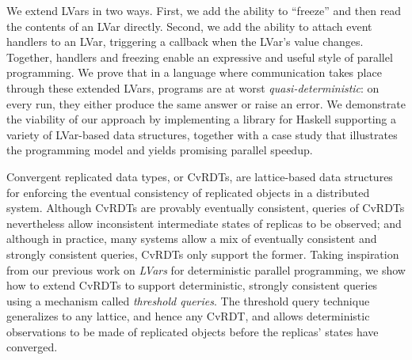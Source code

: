 We extend LVars in two ways.  First, we add the ability to ``freeze'' and then
read the contents of an LVar directly.  Second, we add the ability to attach
event handlers to an LVar, triggering a callback when the LVar's value changes.
Together, handlers and freezing enable an expressive and useful style of
parallel programming.  We prove that in a language where communication takes
place through these extended LVars, programs are at worst \emph{quasi-deterministic}: on
every run, they either produce the same answer or raise an error.  We
demonstrate the viability of our approach by implementing a library for Haskell
supporting a variety of LVar-based data structures, together with a case
study that illustrates the programming model and yields promising parallel
speedup.


Convergent replicated data types, or CvRDTs, are lattice-based data
structures for enforcing the eventual consistency of replicated
objects in a distributed system.  Although CvRDTs are provably
eventually consistent, queries of CvRDTs nevertheless allow
inconsistent intermediate states of replicas to be observed; and
although in practice, many systems allow a mix of eventually consistent and
strongly consistent queries, CvRDTs only support the former.  Taking
inspiration from our previous work on \emph{LVars} for deterministic
parallel programming, we show how to extend CvRDTs to support
deterministic, strongly consistent queries using a mechanism called
\emph{threshold queries}.  The threshold query technique generalizes
to any lattice, and hence any CvRDT, and allows deterministic
observations to be made of replicated objects before the replicas'
states have converged.
